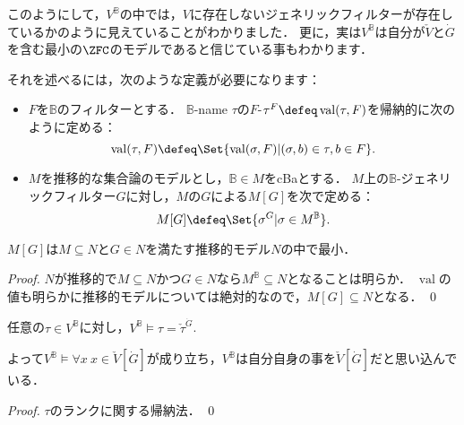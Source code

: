 \documentclass[a4j]{ltjsarticle}
\renewcommand{\emph}[1]{\textbf{\textgt{#1}}}
\newcommand{\val}{\mathop{\mathrm{val}}}
\begin{document}
このようにして，$V^{\mathbb{B}}$の中では，$V$に存在しないジェネリックフィルターが存在しているかのように見えていることがわかりました．
更に，実は$V^{\mathbb{B}}$は自分が$\check{V}$と$\dot{G}$を含む最小の$\ZFC$のモデルであると信じている事もわかります．

それを述べるには，次のような定義が必要になります：

\begin{definition}
 \begin{itemize}
  \item $F$を$\mathbb{B}$のフィルターとする．
        $\mathbb{B}$-name $\tau$の$F$-\emph{解釈}$\tau^F \defeq \val(\tau, F)$を帰納的に次のように定める：
        \[
         \val(\tau, F) \defeq \Set{ \val(\sigma, F) | (\sigma, b) \in \tau, b \in F}.
        \]
  \item $M$を推移的な集合論のモデルとし，$\mathbb{B} \in M$をcBaとする．
        $M$上の$\mathbb{B}$-ジェネリックフィルター$G$に対し，$M$の$G$による\emph{ジェネリック拡大}$M[G]$を次で定める：
        \[
         M[G] \defeq \Set{\sigma^G | \sigma \in M^{\mathbb{B}}}.
        \]
 \end{itemize}
\end{definition}

\begin{lemma}
 $M[G]$は$M \subseteq N$と$G \in N$を満たす推移的モデル$N$の中で最小．
\end{lemma}
\begin{proof}
 $N$が推移的で$M \subseteq N$かつ$G \in N$なら$M^{\mathbb{B}} \subseteq N$となることは明らか．
 $\val$の値も明らかに推移的モデルについては絶対的なので，$M[G] \subseteq N$となる． \qed
\end{proof}

\begin{theorem}
 任意の$\tau \in V^{\mathbb{B}}$に対し，$V^{\mathbb{B}} \models \tau = \check{\tau}^{\dot{G}}$.

 よって$V^{\mathbb{B}} \models \forall x \: x \in \check{V}[\dot{G}]$が成り立ち，$V^{\mathbb{B}}$は自分自身の事を$\check{V}[\dot{G}]$だと思い込んでいる．
\end{theorem}
\begin{proof}
 $\tau$のランクに関する帰納法． \qed
\end{proof}
\end{document}
